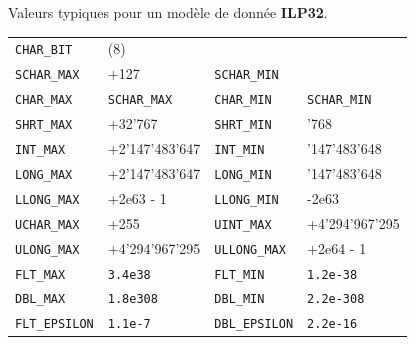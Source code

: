 \documentclass{article}
\newcommand{\cd}{\lstinline}
\begin{document}
\begin{multicols*}{3}
Valeurs typiques pour un modèle de donnée \textbf{ILP32}.

\begin{tabularx}{\linewidth}{
  >{\hsize=0.9\hsize}X%
  >{\hsize=1.2\hsize}X%
  >{\hsize=0.9\hsize}X%
  >{\hsize=1.2\hsize}X%
  }
  \cd{CHAR_BIT}  & (8) &   & \\
  \cd{SCHAR_MAX} & +127 & \cd{SCHAR_MIN} & -128 \\
  \cd{CHAR_MAX} & \cd{SCHAR_MAX} & \cd{CHAR_MIN} & \cd{SCHAR_MIN} \\
  \cd{SHRT_MAX} & +32'767 & \cd{SHRT_MIN} & -32'768 \\
  \cd{INT_MAX} & +2'147'483'647 & \cd{INT_MIN} & -2'147'483'648 \\
  \cd{LONG_MAX} & +2'147'483'647 & \cd{LONG_MIN} & -2'147'483'648 \\
  \cd{LLONG_MAX} & +2e63 - 1 & \cd{LLONG_MIN} & -2e63 \\
  \cd{UCHAR_MAX} & +255 & \cd{UINT_MAX} & +4'294'967'295 \\
  \cd{ULONG_MAX} & +4'294'967'295 & \cd{ULLONG_MAX} & +2e64 - 1 \\
  \cd{FLT_MAX} & \cd{3.4e38} & \cd{FLT_MIN} & \cd{1.2e-38} \\
  \cd{DBL_MAX} & \cd{1.8e308} & \cd{DBL_MIN} & \cd{2.2e-308} \\
  \cd{FLT_EPSILON} & \cd{1.1e-7} & \cd{DBL_EPSILON} & \cd{2.2e-16}
\end{tabularx}


\end{multicols*}
\end{document}
